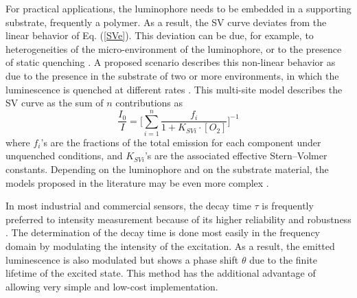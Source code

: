 \documentclass[final,5p,times,twocolumn]{elsarticle}
\begin{document}
For practical applications, the luminophore needs to be embedded in a supporting substrate, frequently a polymer. As a result, the SV curve deviates from the linear behavior of Eq. (\ref{SVe}). This deviation can be due, for example, to heterogeneities of the micro-environment of the luminophore, or to the presence of static quenching \cite{Wang2014}. A proposed scenario describes this non-linear behavior as due to the presence in the substrate of two or more environments, in which the luminescence is quenched at different rates \cite{Carraway1991,Demas1995}. This multi-site model describes the SV curve as the sum of $n$ contributions as
\begin{equation}
\frac{I_0}{I}=\bigg[ \sum_{i=1}^n
\frac{f_i}{1+K_{SVi} \cdot \left[O_2\right]}
\bigg]^{-1}
\label{SVe2}
\end{equation}
where $f_i$'s are the fractions of the total emission for each component under unquenched conditions, and $K_{SVi}$'s are the associated effective Stern–Volmer constants. Depending on the luminophore and on the substrate material, the models proposed in the literature may be even more complex \cite{Demas1995,Hartmann1995,Mills1999}.

In most industrial and commercial sensors, the decay time $\tau$ is frequently preferred to intensity measurement because of its higher reliability and robustness \cite{Wei2019}. The determination of the decay time is done most easily in the frequency domain by modulating the intensity of the excitation.  As a result, the emitted luminescence is also modulated but shows a phase shift $\theta$ due to the finite lifetime of the excited state. This method has the additional advantage of allowing very simple and low-cost implementation.
\end{document}
